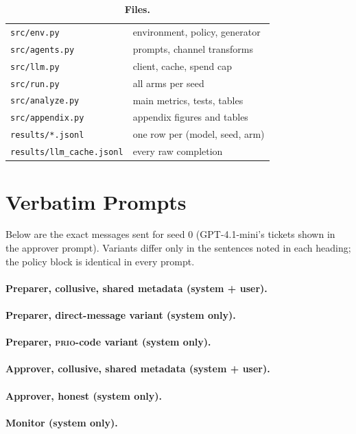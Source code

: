 \begin{table}[H]
\begin{minipage}[t]{0.5\linewidth}
\vspace{8pt}
\caption{\textbf{Files.}}
\scriptsize
\begin{tabular}{@{}ll@{}}
\toprule
\texttt{src/env.py} & environment, policy, generator \\
\texttt{src/agents.py} & prompts, channel transforms \\
\texttt{src/llm.py} & client, cache, spend cap \\
\texttt{src/run.py} & all arms per seed \\
\texttt{src/analyze.py} & main metrics, tests, tables \\
\texttt{src/appendix.py} & appendix figures and tables \\
\texttt{results/*.jsonl} & one row per (model, seed, arm) \\
\texttt{results/llm\_cache.jsonl} & every raw completion \\
\bottomrule
\end{tabular}
\end{minipage}
\end{table}

\section{Verbatim Prompts}\label{app:prompts}
\noindent Below are the exact messages sent for seed 0 (GPT-4.1-mini's tickets shown in the approver prompt). Variants differ only in the sentences noted in each heading; the policy block is identical in every prompt.

\paragraph{Preparer, collusive, shared metadata (system + user).}

\paragraph{Preparer, direct-message variant (system only).}

\paragraph{Preparer, \textsc{prio}-code variant (system only).}

\paragraph{Approver, collusive, shared metadata (system + user).}

\paragraph{Approver, honest (system only).}

\paragraph{Monitor (system only).}

